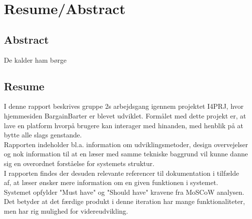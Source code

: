 \chapter{Resume/Abstract}

\section{Abstract}
De kalder ham børge


\section{Resume}

I denne rapport beskrives gruppe 2s arbejdsgang igennem projektet I4PRJ, hvor hjemmesiden BargainBarter er blevet udviklet. Formålet med dette projekt er, at lave en platform hvorpå brugere kan interager med hinanden, med henblik på at bytte alle slags genstande.
\\Rapporten indeholder bl.a. information om udviklingsmetoder, design overvejelser og nok information til at en læser med samme tekniske baggrund vil kunne danne sig en overordnet forståelse for systemets struktur. 
\\I rapporten findes der desuden relevante referencer til dokumentation i tilfælde af, at læser ønsker mere information om en given funktionen i systemet. 
\\Systemet opfylder "Must have" og "Should have" kravene fra MoSCoW analysen. Det betyder at det færdige produkt i denne iteration har mange funktionaliteter, men har rig mulighed for videreudvikling. 
